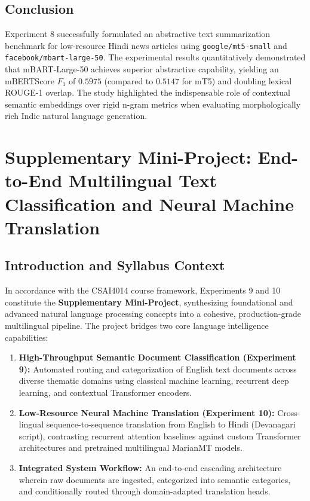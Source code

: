 \documentclass[12pt,a4paper]{report}
\begin{document}
\section{Conclusion}
Experiment 8 successfully formulated an abstractive text summarization benchmark for low-resource Hindi news articles using \texttt{google/mt5-small} and \texttt{facebook/mbart-large-50}. The experimental results quantitatively demonstrated that mBART-Large-50 achieves superior abstractive capability, yielding an mBERTScore $F_1$ of $0.5975$ (compared to $0.5147$ for mT5) and doubling lexical ROUGE-1 overlap. The study highlighted the indispensable role of contextual semantic embeddings over rigid n-gram metrics when evaluating morphologically rich Indic natural language generation.






\chapter{Supplementary Mini-Project: End-to-End Multilingual Text Classification and Neural Machine Translation}

\section{Introduction and Syllabus Context}
In accordance with the CSAI4014 course framework, Experiments 9 and 10 constitute the \textbf{Supplementary Mini-Project}, synthesizing foundational and advanced natural language processing concepts into a cohesive, production-grade multilingual pipeline. The project bridges two core language intelligence capabilities:
\begin{enumerate}
    \item \textbf{High-Throughput Semantic Document Classification (Experiment 9):} Automated routing and categorization of English text documents across diverse thematic domains using classical machine learning, recurrent deep learning, and contextual Transformer encoders.
    \item \textbf{Low-Resource Neural Machine Translation (Experiment 10):} Cross-lingual sequence-to-sequence translation from English to Hindi (Devanagari script), contrasting recurrent attention baselines against custom Transformer architectures and pretrained multilingual MarianMT models.
    \item \textbf{Integrated System Workflow:} An end-to-end cascading architecture wherein raw documents are ingested, categorized into semantic categories, and conditionally routed through domain-adapted translation heads.
\end{enumerate}
\end{document}
